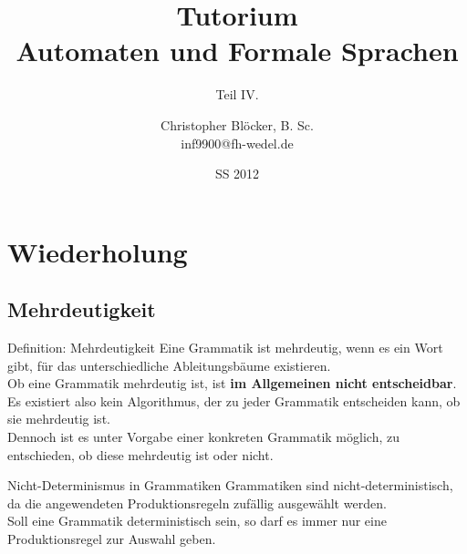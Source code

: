 \documentclass[]{beamer}
\author[Christopher Blöcker, B. Sc.]{Christopher Blöcker, B. Sc.\\ inf9900@fh-wedel.de}
\title[AFS Tutorium]{Tutorium\\Automaten und Formale Sprachen}
\date{SS 2012}
\subtitle{Teil IV.}
\begin{document}
\begin{frame}
  \titlepage
\end{frame}

\section{Wiederholung}
\subsection{Mehrdeutigkeit}
\begin{frame}[squeeze]{}
  \begin{block}{Definition: Mehrdeutigkeit}
    Eine Grammatik ist mehrdeutig, wenn es ein Wort gibt, für das unterschiedliche Ableitungsbäume existieren. \\
    \vspace*{0.5em}
    Ob eine Grammatik mehrdeutig ist, ist \textbf{im Allgemeinen nicht entscheidbar}. Es existiert also kein Algorithmus, der zu jeder Grammatik entscheiden kann, ob sie mehrdeutig ist. \\
    \vspace*{0.5em}
    Dennoch ist es unter Vorgabe einer konkreten Grammatik möglich, zu entschieden, ob diese mehrdeutig ist oder nicht.
  \end{block}
  
  \pause
  
  \begin{block}{Nicht-Determinismus in Grammatiken}
    Grammatiken sind nicht-deterministisch, da die angewendeten Produktionsregeln zufällig ausgewählt werden. \\
    \vspace*{0.5em}
    Soll eine Grammatik deterministisch sein, so darf es immer nur eine Produktionsregel zur Auswahl geben.
  \end{block}
\end{frame}
\end{document}
